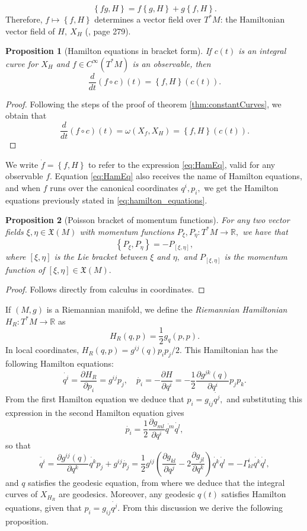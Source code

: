 \documentclass[12pt, letterpaper, reqno]{amsart}
\theoremstyle{definition}
\theoremstyle{plain}
\newtheorem{prop}{Proposition}
\theoremstyle{remark}
\begin{document}
$$ \left\{ fg,H \right\} =f \left\{ g,H \right\} +g \left\{ f,H \right\} . $$ 
Therefore, $ f\mapsto \left\{ f,H \right\}  $ determines a vector field over $T^*M$: the Hamiltonian vector field of $ H, \ X_H $ (\cite{montgomery2002tour}, page 279).

\begin{prop}[Hamilton equations in bracket form]\label{prop:HEBF}
	If $ c(t) $ is an integral curve for $ X_H $ and $ f\in C^\infty(T^*M) $ is an observable, then
	\begin{equation}\label{eq:HamEq}
		\frac{d}{dt} \left( f\circ c \right)(t) = \left\{ f,H \right\} (c(t)).
	\end{equation}
\end{prop}
\begin{proof}
	Following the steps of the proof of theorem \ref{thm:constantCurves}, we obtain that
	$$ \frac{d}{dt} \left( f\circ c \right) (t)=\omega(X_f, X_H)= \left\{ f,H \right\}(c(t)).  $$ 
\end{proof}

We write $ \dot{f}= \left\{ f,H \right\} $ to refer to the expression \eqref{eq:HamEq}, valid for any observable $ f. $ Equation \eqref{eq:HamEq} also receives the name of Hamilton equations, and when $ f $ runs over the canonical coordinates $ q^i,p_i, $ we get the Hamilton equations previously stated in \eqref{eq:hamilton_equations}.

\begin{prop}[Poisson bracket of momentum functions]
	For any two vector fields $ \xi,\eta \in \mathfrak{X}(M) $ with momentum functions $ P_\xi, P_\eta: T^*M \rightarrow \mathbb{R}, $ we have that
	$$ \left\{ P_\xi,P_\eta \right\} = -P_{[\xi,\eta]}, $$ 
	where $ [\xi,\eta] $ is the Lie bracket between $ \xi $ and $ \eta, $ and $ P_{[\xi,\eta]} $ is the momentum function of $ [\xi,\eta]\in \mathfrak{X}(M). $  
\end{prop}
\begin{proof}
	Follows directly from calculus in coordinates.
\end{proof}
If $ (M,g) $ is a Riemannian manifold, we define the \textit{Riemannian Hamiltonian} $ H_R: T^*M \rightarrow \mathbb{R} $ as
$$ H_R(q,p)=\frac{1}{2} g_q(p,p).$$
In local coordinates, $  H_R(q,p)= g^{ij}(q)p_ip_j/2. $ This Hamiltonian has the following Hamilton equations:
$$ \dot{q^i} = \frac{\partial H_R}{\partial p_i} = g^{ij}p_j, \quad \dot{p_i} = - \frac{\partial H}{\partial q^i} = - \frac{1}{2} \frac{\partial g^{jk}(q)}{\partial q^i} p_jp_k. $$ 
From the first Hamilton equation we deduce that $ p_i = g_{ij}\dot{q^j}, $ and substituting this expression in the second Hamilton equation gives $$ \dot{p_i} = \frac{1}{2} \frac{\partial g_{ml}}{\partial q^i}\dot{q^m}\dot{q^l} ,$$ so that 
$$ \ddot{q^i} = \frac{\partial g^{ij}(q)}{\partial q^k} \dot{q^k}p_j+ g^{ij}\dot{p_j}= \frac{1}{2} g^{ij} \left( \frac{\partial g_{kl}}{\partial q^j}-2 \frac{\partial g_{jl}}{\partial q^k}   \right)\dot{q^k}\dot{q^l} = -\Gamma_{kl}^i \dot{q^k}\dot{q^l},$$ 
and $ q $ satisfies the geodesic equation, from where we deduce that the integral curves of $ X_{H_R} $ are geodesics. Moreover, any geodesic $ q(t) $ satisfies Hamilton equations, given that $ p_i = g_{ij}\dot{q^j}. $ From this discussion we derive the following proposition.
\end{document}
